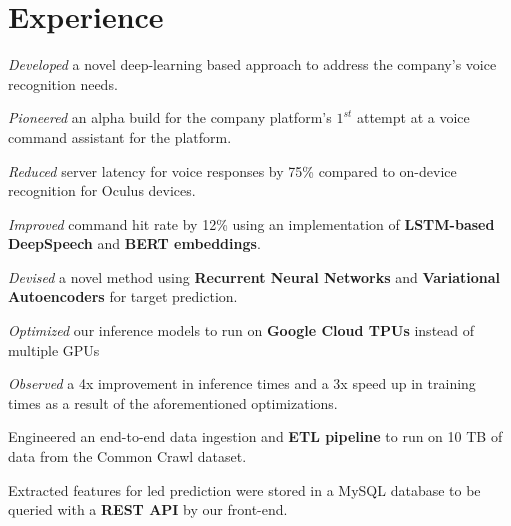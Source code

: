 \documentclass[]{deedy-resume-openfont}
\begin{document}
\begin{minipage}[t]{0.66\textwidth}


\section{Experience}
\vspace{\topsep} %
\begin{tightemize}
\item \emph{Developed} a novel deep-learning based approach to address the company's voice recognition needs.
\item \emph{Pioneered} an alpha build for the company platform's $1^{st}$ attempt at a voice command assistant for the platform.
\item \emph{Reduced} server latency for voice responses by 75\% compared to on-device recognition for Oculus devices.
\item \emph{Improved} command hit rate by 12\% using an implementation of \textbf{LSTM-based DeepSpeech} and \textbf{BERT embeddings}.
\end{tightemize}
\sectionsep

\begin{tightemize}
\item \emph{Devised} a novel method using \textbf{Recurrent Neural Networks} and \textbf{Variational Autoencoders} for target prediction.
\item \emph{Optimized} our inference models to run on \textbf{Google Cloud TPUs} instead of multiple GPUs
\item \emph{Observed} a 4x improvement in inference times and a 3x speed up in training times as a result of the aforementioned optimizations.
\item {Engineered} an end-to-end data ingestion and \textbf{ETL pipeline} to
    run on 10 TB of data from the Common Crawl dataset.
\item Extracted features for led prediction were stored in a MySQL database to be queried with a \textbf{REST API} by our front-end.
\end{tightemize}
\sectionsep


\end{minipage}
\end{document}
